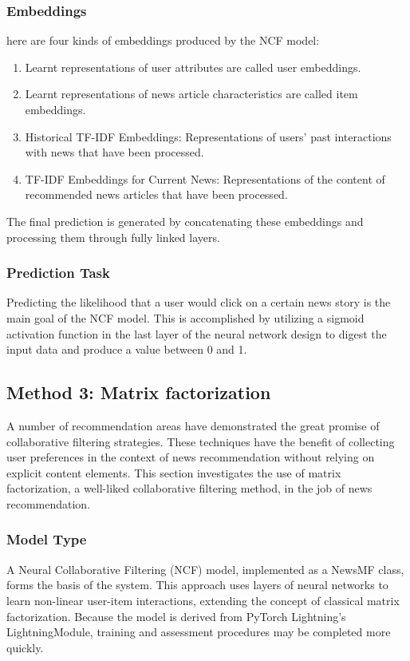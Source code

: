 \documentclass[9pt,twocolumn,twoside,lineno]{gsajnl}
\begin{document}
\subsubsection{Embeddings\newline}
here are four kinds of embeddings produced by the NCF model:

\begin{enumerate}
    \item Learnt representations of user attributes are called user embeddings.
    \item Learnt representations of news article characteristics are called item embeddings.
    \item Historical TF-IDF Embeddings: Representations of users' past interactions with news that have been processed.    
    \item TF-IDF Embeddings for Current News: Representations of the content of recommended news articles that have been processed.
\end{enumerate}

The final prediction is generated by concatenating these embeddings and processing them through fully linked layers.

\subsubsection{Prediction Task\newline}
Predicting the likelihood that a user would click on a certain news story is the main goal of the NCF model. This is accomplished by utilizing a sigmoid activation function in the last layer of the neural network design to digest the input data and produce a value between 0 and 1.

\subsection{Method 3: Matrix factorization}
A number of recommendation areas have demonstrated the great promise of collaborative filtering strategies. These techniques have the benefit of collecting user preferences in the context of news recommendation without relying on explicit content elements. This section investigates the use of matrix factorization, a well-liked collaborative filtering method, in the job of news recommendation.

\subsubsection{Model Type\newline}
A Neural Collaborative Filtering (NCF) model, implemented as a NewsMF class, forms the basis of the system. This approach uses layers of neural networks to learn non-linear user-item interactions, extending the concept of classical matrix factorization. Because the model is derived from PyTorch Lightning's LightningModule, training and assessment procedures may be completed more quickly.
\end{document}
